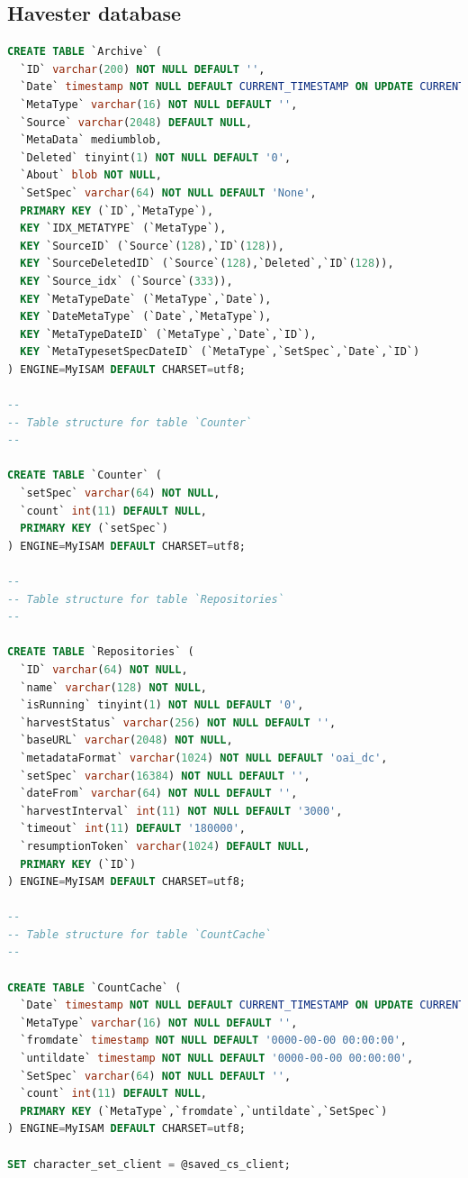 \documentclass[a4paper,11pt]{article}
\begin{document}
\subsection{Havester database}

\begin{lstlisting}[language=SQL]
CREATE TABLE `Archive` (
  `ID` varchar(200) NOT NULL DEFAULT '', 
  `Date` timestamp NOT NULL DEFAULT CURRENT_TIMESTAMP ON UPDATE CURRENT_TIMESTAMP,
  `MetaType` varchar(16) NOT NULL DEFAULT '', 
  `Source` varchar(2048) DEFAULT NULL,
  `MetaData` mediumblob,
  `Deleted` tinyint(1) NOT NULL DEFAULT '0',
  `About` blob NOT NULL,
  `SetSpec` varchar(64) NOT NULL DEFAULT 'None',
  PRIMARY KEY (`ID`,`MetaType`),
  KEY `IDX_METATYPE` (`MetaType`),
  KEY `SourceID` (`Source`(128),`ID`(128)),
  KEY `SourceDeletedID` (`Source`(128),`Deleted`,`ID`(128)),
  KEY `Source_idx` (`Source`(333)),
  KEY `MetaTypeDate` (`MetaType`,`Date`),
  KEY `DateMetaType` (`Date`,`MetaType`),
  KEY `MetaTypeDateID` (`MetaType`,`Date`,`ID`),
  KEY `MetaTypesetSpecDateID` (`MetaType`,`SetSpec`,`Date`,`ID`)
) ENGINE=MyISAM DEFAULT CHARSET=utf8;   

--
-- Table structure for table `Counter`
--

CREATE TABLE `Counter` (
  `setSpec` varchar(64) NOT NULL,
  `count` int(11) DEFAULT NULL,
  PRIMARY KEY (`setSpec`)
) ENGINE=MyISAM DEFAULT CHARSET=utf8;

--
-- Table structure for table `Repositories`
--

CREATE TABLE `Repositories` (
  `ID` varchar(64) NOT NULL,
  `name` varchar(128) NOT NULL,
  `isRunning` tinyint(1) NOT NULL DEFAULT '0',
  `harvestStatus` varchar(256) NOT NULL DEFAULT '',
  `baseURL` varchar(2048) NOT NULL,
  `metadataFormat` varchar(1024) NOT NULL DEFAULT 'oai_dc',
  `setSpec` varchar(16384) NOT NULL DEFAULT '',
  `dateFrom` varchar(64) NOT NULL DEFAULT '',
  `harvestInterval` int(11) NOT NULL DEFAULT '3000',
  `timeout` int(11) DEFAULT '180000',
  `resumptionToken` varchar(1024) DEFAULT NULL,
  PRIMARY KEY (`ID`)
) ENGINE=MyISAM DEFAULT CHARSET=utf8;

--
-- Table structure for table `CountCache`
--

CREATE TABLE `CountCache` (
  `Date` timestamp NOT NULL DEFAULT CURRENT_TIMESTAMP ON UPDATE CURRENT_TIMESTAMP,
  `MetaType` varchar(16) NOT NULL DEFAULT '',
  `fromdate` timestamp NOT NULL DEFAULT '0000-00-00 00:00:00',
  `untildate` timestamp NOT NULL DEFAULT '0000-00-00 00:00:00',
  `SetSpec` varchar(64) NOT NULL DEFAULT '',
  `count` int(11) DEFAULT NULL,
  PRIMARY KEY (`MetaType`,`fromdate`,`untildate`,`SetSpec`)
) ENGINE=MyISAM DEFAULT CHARSET=utf8;

SET character_set_client = @saved_cs_client;

\end{lstlisting}
\end{document}
